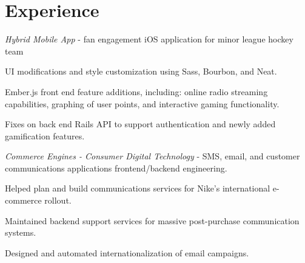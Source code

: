 \documentclass[]{deedy-resume-openfont}
\begin{document}
\hfill
\begin{minipage}[t]{0.66\textwidth} 


\section{Experience}

\sectionsep

\textit{Hybrid Mobile App} - fan engagement iOS application for minor league hockey team
\vspace{\topsep} %
\begin{tightemize}
\item UI modifications and style customization using Sass, Bourbon, and Neat.
\item Ember.js front end feature additions, including: online radio streaming capabilities, graphing of user points, and interactive gaming functionality.
\item Fixes on back end Rails API to support authentication and newly added gamification features.
\end{tightemize}
\sectionsep

\textit{Commerce Engines - Consumer Digital Technology} - SMS, email, and customer communications applications frontend/backend engineering.
\begin{tightemize}
\item Helped plan and build communications services for Nike's international e-commerce rollout.
\item Maintained backend support services for massive post-purchase communication systems.
\item Designed and automated internationalization of email campaigns.
\end{tightemize}
\sectionsep


\end{minipage}
\end{document}
